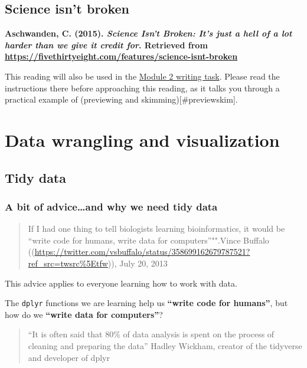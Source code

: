 \documentclass[
  openany]{book}
\begin{document}
\hypertarget{science-isnt-broken}{%
\subsection{Science isn't broken}\label{science-isnt-broken}}

\textbf{Aschwanden, C. (2015). \emph{Science Isn't Broken: It's just a hell of a lot harder than we give it credit for}. Retrieved from \url{https://fivethirtyeight.com/features/science-isnt-broken}}

This reading will also be used in the \protect\hyperlink{module-2-writing-task}{Module 2 writing task}. Please read the instructions there before approaching this reading, as it talks you through a practical example of (previewing and skimming){[}\#previewskim{]}.

\hypertarget{data-wrangling-and-visualization}{%
\section{Data wrangling and visualization}\label{data-wrangling-and-visualization}}

\hypertarget{tidy-data}{%
\subsection{Tidy data}\label{tidy-data}}

\hypertarget{a-bit-of-adviceand-why-we-need-tidy-data}{%
\subsubsection{\texorpdfstring{A bit of advice\ldots and why we need \textbf{tidy} data}{A bit of advice\ldots and why we need tidy data}}\label{a-bit-of-adviceand-why-we-need-tidy-data}}

\begin{quote}
If I had one thing to tell biologists learning bioinformatics, it would be ``write code for humans, write data for computers''"".Vince Buffalo (\citep{vsbuffalo}(\url{https://twitter.com/vsbuffalo/status/358699162679787521?ref_src=twsrc\%5Etfw})), July 20, 2013
\end{quote}

This advice applies to everyone learning how to work with data.

The \texttt{dplyr} functions we are learning help us \textbf{``write code for humans''}, but how do we \textbf{``write data for computers''}?

\begin{quote}
``It is often said that 80\% of data analysis is spent on the process of cleaning and preparing the data'' Hadley Wickham, creator of the tidyverse and developer of dplyr
\end{quote}
\end{document}
